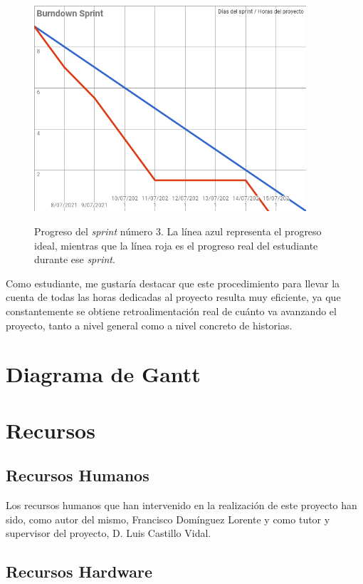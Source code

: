 \begin{figure}[h]
\centering
\includegraphics[width=0.9\textwidth]{logos/sprint4.png}\\[1.4cm]
\caption{Progreso del \textit{sprint} número 3. La línea azul representa el progreso ideal, mientras que la línea roja es el progreso real del estudiante durante ese \textit{sprint}.}
\label{img:sprint3}
\end{figure}

Como estudiante, me gustaría destacar que este procedimiento para llevar la cuenta de todas las horas dedicadas al proyecto resulta muy eficiente, ya que constantemente se obtiene retroalimentación real de cuánto va avanzando el proyecto, tanto a nivel general como a nivel concreto de historias.

\section{Diagrama de Gantt}

\section{Recursos}

\subsection{Recursos Humanos}

Los recursos humanos que han intervenido en la realización de este proyecto han sido, como autor del mismo, Francisco Domínguez Lorente y como tutor y supervisor del proyecto, D. Luis Castillo Vidal.

\subsection{Recursos Hardware}

